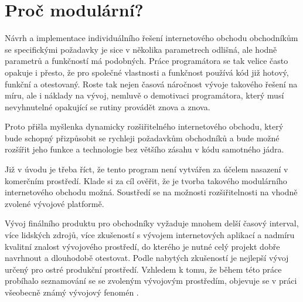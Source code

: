 \documentclass[11pt,twoside,a4paper]{book}
\begin{document}
\section*{Proč modulární?}

Návrh a implementace individuálního řešení internetového obchodu obchodníkům se specifickými požadavky je sice v několika parametrech odlišná, ale hodně parametrů a funkčností má podobných. Práce programátora se tak velice často opakuje i přesto, že pro společné vlastnosti a funkčnost používá kód již hotový, funkční a otestovaný. Roste tak nejen časová náročnost vývoje takového řešení na míru, ale i náklady na vývoj, nemluvě o demotivaci programátora, který musí nevyhnutelné opakující se rutiny provádět znova a znova.

Proto přišla myšlenka dynamicky rozšiřitelného internetového obchodu, který bude schopný přizpůsobit se rychleji požadavkům obchodníků a bude možné rozšířit jeho funkce a technologie bez většího zásahu v kódu samotného jádra.

Již v úvodu je třeba říct, že tento program není vytvářen za účelem nasazení v komerčním prostředí. Klade si za cíl ověřit, že je tvorba takového modulárního internetového obchodu možná. Soustředí se na  možnosti rozšiřitelnosti na vhodně zvolené vývojové platformě.

Vývoj finálního produktu pro obchodníky vyžaduje mnohem delší časový interval, více lidských zdrojů, více zkušeností s vývojem internetových aplikací a nadmíru kvalitní znalost vývojového prostředí, do kterého je nutné celý projekt dobře navrhnout a dlouhodobě otestovat. Podle nabytých zkušeností je nejlepší vývoj určený pro ostré produkční prostředí. Vzhledem k tomu, že během této práce probíhalo seznamování se se zvoleným vývojovým prostředím, objevuje se v práci všeobecně známý vývojový fenomén .
\end{document}
